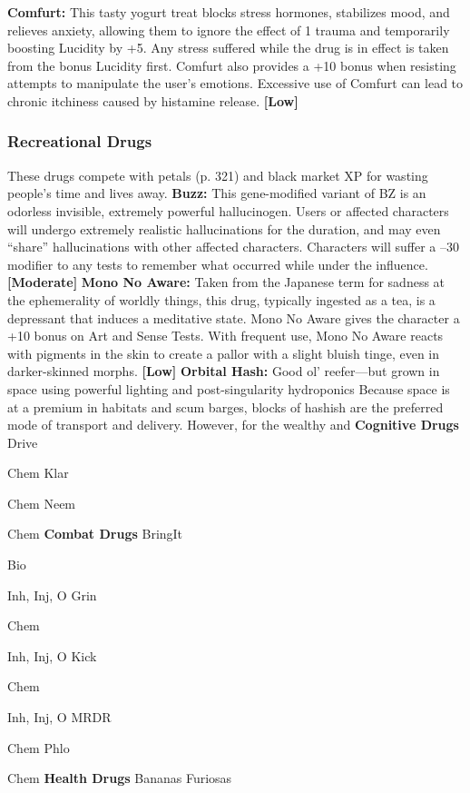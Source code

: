 \textbf{Comfurt:} This tasty yogurt treat blocks stress 
hormones, stabilizes mood, and relieves anxiety, allowing
them to ignore the effect of 1 trauma and temporarily
boosting Lucidity by +5. Any stress suffered
while the drug is in effect is taken from the bonus Lucidity
first. Comfurt also provides a +10 bonus when
resisting attempts to manipulate the user's emotions. 
Excessive use of Comfurt can lead to chronic itchiness 
caused by histamine release. \textbf{[Low]}

\subsubsection{Recreational Drugs}

These drugs compete with petals (p. 321) and black 
market XP for wasting people's time and lives away.
\textbf{Buzz:} This gene-modified variant of BZ is an odorless
invisible, extremely powerful hallucinogen. Users
or affected characters will undergo extremely realistic 
hallucinations for the duration, and may even ``share'' 
hallucinations with other affected characters. Characters
will suffer a –30 modifier to any tests to remember
what occurred while under the influence. \textbf{[Moderate]}
\textbf{Mono No Aware:} Taken from the Japanese term 
for sadness at the ephemerality of worldly things, this 
drug, typically ingested as a tea, is a depressant that 
induces a meditative state. Mono No Aware gives the 
character a +10 bonus on Art and Sense Tests. With 
frequent use, Mono No Aware reacts with pigments 
in the skin to create a pallor with a slight bluish tinge, 
even in darker-skinned morphs. \textbf{[Low]}
\textbf{Orbital Hash:} Good ol' reefer—but grown in space 
using powerful lighting and post-singularity hydroponics
Because space is at a premium in habitats and scum
barges, blocks of hashish are the preferred mode of 
transport and delivery. However, for the wealthy and 
\textbf{Cognitive Drugs}
Drive

Chem
Klar

Chem
Neem

Chem
\textbf{Combat Drugs}
BringIt

Bio

Inh, Inj, O
Grin

Chem

Inh, Inj, O
Kick

Chem

Inh, Inj, O
MRDR

Chem
Phlo

Chem
\textbf{Health Drugs}
Bananas Furiosas

